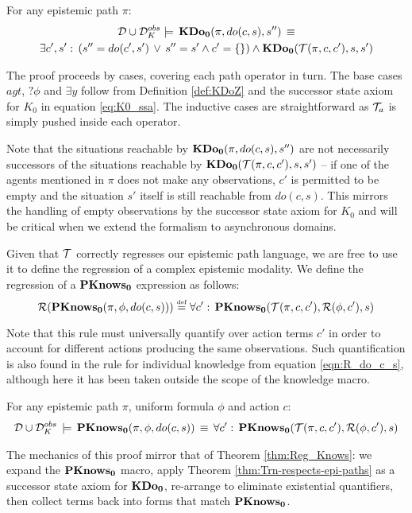 \begin{thm}
\label{thm:Trn-respects-epi-paths}For any epistemic path $\pi$:\begin{multline*}
\mathcal{D}\cup\mathcal{D}_{K}^{obs}\models\,\mathbf{KDo_{0}}(\pi,do(c,s),s'')\,\equiv\\
\exists c',s':\,\left(s''=do(c',s')\,\vee\, s''=s'\wedge c'=\{\}\right)\wedge\mathbf{KDo_{0}}(\mathcal{T}(\pi,c,c'),s,s')\end{multline*}

\end{thm}
\begin{proofsketch}
The proof proceeds by cases, covering each path operator in turn.
The base cases $agt$, $?\phi$ and $\exists y$ follow from Definition
\ref{def:KDoZ} and the successor state axiom for $K_{0}$ in equation
\eqref{eq:K0_ssa}. The inductive cases are straightforward as $\mathcal{T}_{a}$
is simply pushed inside each operator. 
\end{proofsketch}
Note that the situations reachable by $\mathbf{KDo_{0}}(\pi,do(c,s),s'')$ are
not necessarily successors of the situations reachable by $\mathbf{KDo_{0}}(\mathcal{T}(\pi,c,c'),s,s')$
-- if one of the agents mentioned in $\pi$ does not make any observations,
$c'$ is permitted to be empty and the situation $s'$ itself is still
reachable from $do(c,s)$. This mirrors the handling of empty observations
by the successor state axiom for $K_{0}$ and will be critical when
we extend the formalism to asynchronous domains.

Given that $\mathcal{T}$ correctly regresses our epistemic path language,
we are free to use it to define the regression of a complex epistemic
modality. We define the regression of a $\mathbf{PKnows_{0}}$ expression as
follows:\[
\mathcal{R}(\mathbf{PKnows_{0}}(\pi,\phi,do(c,s)))\stackrel{\mbox{\tiny def}}{=}\forall c':\,\mathbf{PKnows_{0}}(\mathcal{T}(\pi,c,c'),\mathcal{R}(\phi,c'),s)\]


Note that this rule must universally quantify over action terms $c'$
in order to account for different actions producing the same observations.
Such quantification is also found in the rule for individual knowledge
from equation \eqref{eqn:R_do_c_s}, although here it has been taken
outside the scope of the knowledge macro.

\begin{thm}
\label{thm:Reg_PKnowsZ}For any epistemic path $\pi$, uniform formula
$\phi$ and action $c$:\begin{gather*}
\mathcal{D}\cup\mathcal{D}_{K}^{obs}\,\models\,\mathbf{PKnows_{0}}(\pi,\phi,do(c,s))\,\equiv\,\forall c':\,\mathbf{PKnows_{0}}(\mathcal{T}(\pi,c,c'),\mathcal{R}(\phi,c'),s)\end{gather*}

\end{thm}
\begin{proofsketch}
The mechanics of this proof mirror that of Theorem \ref{thm:Reg_Knows}:
we expand the $\mathbf{PKnows_{0}}$ macro, apply Theorem \ref{thm:Trn-respects-epi-paths}
as a successor state axiom for $\mathbf{KDo_{0}}$, re-arrange to eliminate existential
quantifiers, then collect terms back into forms that match $\mathbf{PKnows_{0}}$. 
\end{proofsketch}

